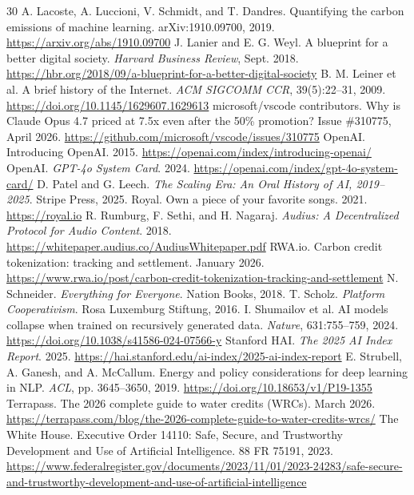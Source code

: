 \documentclass[10pt,a4paper,twocolumn]{article}
\begin{document}
{\begin{thebibliography}{30}
 A. Lacoste, A. Luccioni, V. Schmidt, and T. Dandres. Quantifying the carbon emissions of machine learning. arXiv:1910.09700, 2019. \url{https://arxiv.org/abs/1910.09700}
 J. Lanier and E. G. Weyl. A blueprint for a better digital society. \emph{Harvard Business Review}, Sept. 2018. \url{https://hbr.org/2018/09/a-blueprint-for-a-better-digital-society}
 B. M. Leiner et al. A brief history of the Internet. \emph{ACM SIGCOMM CCR}, 39(5):22--31, 2009. \url{https://doi.org/10.1145/1629607.1629613}
 microsoft/vscode contributors. Why is Claude Opus 4.7 priced at 7.5x even after the 50\% promotion? Issue \#310775, April 2026. \url{https://github.com/microsoft/vscode/issues/310775}
 OpenAI. Introducing OpenAI. 2015. \url{https://openai.com/index/introducing-openai/}
 OpenAI. \emph{GPT-4o System Card}. 2024. \url{https://openai.com/index/gpt-4o-system-card/}
 D. Patel and G. Leech. \emph{The Scaling Era: An Oral History of AI, 2019--2025}. Stripe Press, 2025.
 Royal. Own a piece of your favorite songs. 2021. \url{https://royal.io}
 R. Rumburg, F. Sethi, and H. Nagaraj. \emph{Audius: A Decentralized Protocol for Audio Content}. 2018. \url{https://whitepaper.audius.co/AudiusWhitepaper.pdf}
 RWA.io. Carbon credit tokenization: tracking and settlement. January 2026. \url{https://www.rwa.io/post/carbon-credit-tokenization-tracking-and-settlement}
 N. Schneider. \emph{Everything for Everyone}. Nation Books, 2018.
 T. Scholz. \emph{Platform Cooperativism}. Rosa Luxemburg Stiftung, 2016.
 I. Shumailov et al. AI models collapse when trained on recursively generated data. \emph{Nature}, 631:755--759, 2024. \url{https://doi.org/10.1038/s41586-024-07566-y}
 Stanford HAI. \emph{The 2025 AI Index Report}. 2025. \url{https://hai.stanford.edu/ai-index/2025-ai-index-report}
 E. Strubell, A. Ganesh, and A. McCallum. Energy and policy considerations for deep learning in NLP. \emph{ACL}, pp. 3645--3650, 2019. \url{https://doi.org/10.18653/v1/P19-1355}
 Terrapass. The 2026 complete guide to water credits (WRCs). March 2026. \url{https://terrapass.com/blog/the-2026-complete-guide-to-water-credits-wrcs/}
 The White House. Executive Order 14110: Safe, Secure, and Trustworthy Development and Use of Artificial Intelligence. 88 FR 75191, 2023. \url{https://www.federalregister.gov/documents/2023/11/01/2023-24283/safe-secure-and-trustworthy-development-and-use-of-artificial-intelligence}

\end{thebibliography}}
\end{document}
